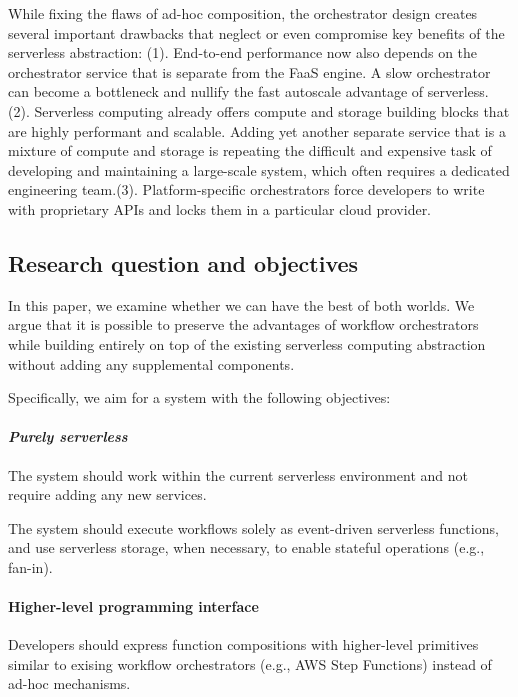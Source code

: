 While fixing the flaws of ad-hoc composition, the orchestrator design creates
several important drawbacks that neglect or even compromise key benefits of
the serverless abstraction: (1). End-to-end performance now also depends on
the orchestrator service that is separate from the FaaS engine. A slow
orchestrator can become a bottleneck and nullify the fast autoscale advantage
of serverless. (2). Serverless computing already offers compute and storage
building blocks that are highly performant and scalable. Adding yet another
separate service that is a mixture of compute and storage is repeating the
difficult and expensive task of developing and maintaining a large-scale system,
which often requires a dedicated engineering team.(3). Platform-specific
orchestrators force developers to write with proprietary APIs and locks them
in a particular cloud provider. 

\subsection{Research question and objectives}

In this paper, we examine whether we can have the best of both worlds. We
argue that it is possible to preserve the advantages of workflow orchestrators
while building entirely on top of the existing serverless computing
abstraction without adding any supplemental components.

Specifically, we aim for a system with the following objectives:

\paragraph{\emph{Purely serverless}} The system should work within the current
serverless environment and not require adding any new services.

The system should execute workflows solely as event-driven serverless
functions, and use serverless storage, when necessary, to enable stateful
operations (e.g., fan-in).

\paragraph{Higher-level programming interface} Developers should express
function compositions with higher-level primitives similar to exising workflow
orchestrators (e.g., AWS Step Functions) instead of ad-hoc mechanisms.

